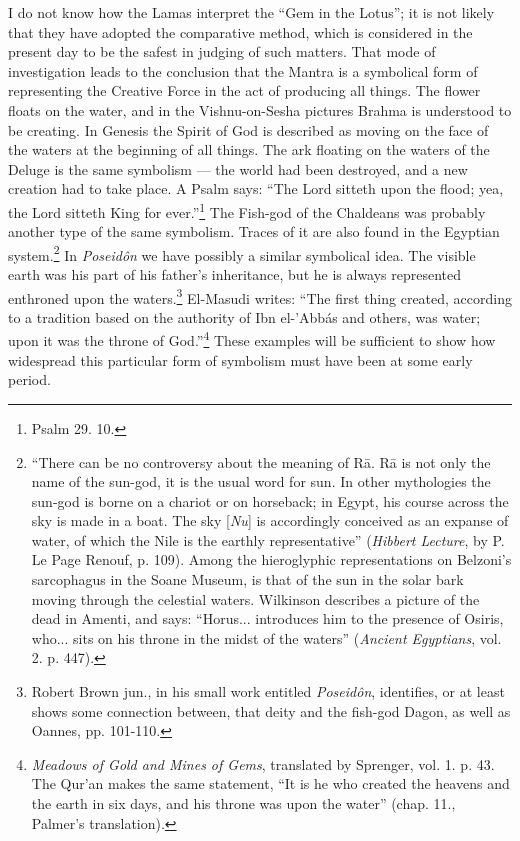 \documentclass[a4paper, 11pt, oneside, polutonikogreek, english]{article}
\begin{document}
I do not know how the Lamas interpret the ``Gem in the Lotus''; it is not likely that they have adopted the comparative method, which is considered in the present day to be the safest in judging of such matters. That mode of investigation leads to the conclusion that the Mantra is a symbolical form of representing the Creative Force in the act of producing all things. The flower floats on the water, and in the Vishnu-on-Sesha pictures Brahma is understood to be creating. In Genesis the Spirit of God is described as moving on the face of the waters at the beginning of all things. The ark floating on the waters of the Deluge is the same symbolism --- the world had been destroyed, and a new creation had to take place. A Psalm says: ``The Lord sitteth upon the flood; yea, the Lord sitteth King for ever.''\footnote{Psalm 29. 10.} The Fish-god of the Chaldeans was probably another type of the same symbolism. Traces of it are also found in the Egyptian system.\footnote{``There can be no controversy about the meaning of Rā. Rā is not only the name of the sun-god, it is the usual word for sun. In other mythologies the sun-god is borne on a chariot or on horseback; in Egypt, his course across the sky is made in a boat. The sky [\emph{Nu}] is accordingly conceived as an expanse of water, of which the Nile is the earthly representative'' (\emph{Hibbert Lecture}, by P. Le Page Renouf, p. 109). Among the hieroglyphic representations on Belzoni's sarcophagus in the Soane Museum, is that of the sun in the solar bark moving through the celestial waters. Wilkinson describes a picture of the dead in Amenti, and says: ``Horus... introduces him to the presence of Osiris, who... sits on his throne in the midst of the waters'' (\emph{Ancient Egyptians}, vol. 2. p. 447).} In \emph{Poseidôn} we have possibly a similar symbolical idea. The visible earth was his part of his father's inheritance, but he is always represented enthroned upon the waters.\footnote{Robert Brown jun., in his small work entitled \emph{Poseidôn}, identifies, or at least shows some connection between, that deity and the fish-god Dagon, as well as Oannes, pp. 101-110.} El-Masudi writes: ``The first thing created, according to a tradition based on the authority of Ibn el-'Abbás and others, was water; upon it was the throne of God.''\footnote{\emph{Meadows of Gold and Mines of Gems}, translated by Sprenger, vol. 1. p. 43. The Qur'an makes the same statement, ``It is he who created the heavens and the earth in six days, and his throne was upon the water'' (chap. 11., Palmer's translation).} These examples will be sufficient to show how widespread this particular form of symbolism must have been at some early period.
\end{document}
